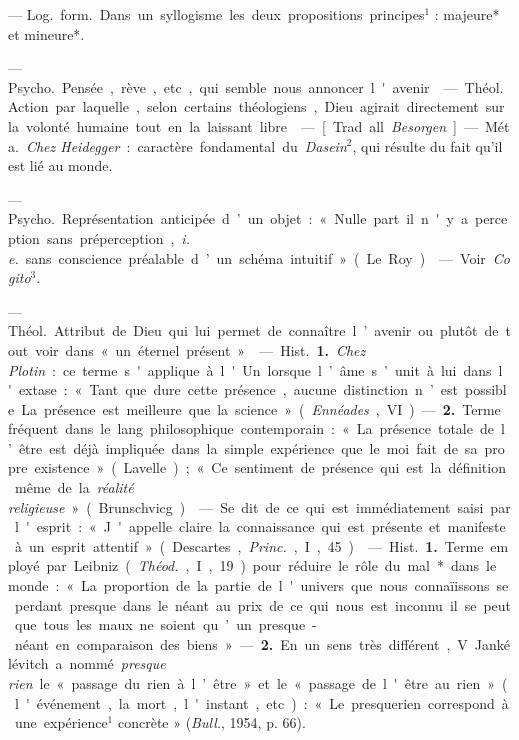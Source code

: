 \begin{itemize}[leftmargin=1cm, label=, itemsep=1pt]
 — \si{Log.} \si{form.} Dans un syllogisme les deux
propositions principes$^1$ : majeure* et mineure*.

 — \si{Psycho.} Pensée, rève, etc., qui semble nous annoncer
l'avenir.

 — \si{Théol.} Action par laquelle, selon certains
théologiens, Dieu agirait directement sur la volonté humaine tout en la
laissant libre.

 — [Trad. all. {\it Besorgen}] — \si{Méta.} {\it Chez
Heidegger} : caractère fondamental du {\it Dasein}$^2$, qui résulte du fait
qu'il est lié au monde.

 — \si{Psycho.} Représentation anticipée d’un objet : «
Nulle part il n'y a perception sans préperception, {\it i. e.} sans
conscience préalable d’un schéma intuitif. » (Le Roy).

 — Voir {\it Cogito}$^3$.

 — \si{Théol.} Attribut de Dieu qui lui permet de connaître
l’avenir ou plutôt de tout voir dans « un éternel présent ».

 — \si{Hist.} {\bf 1.} {\it Chez Plotin} : ce
terme s'applique à l'Un lorsque
l’âme s’unit à lui dans l'extase : « Tant que dure cette présence, aucune
distinction n’est possible... La présence est meilleure que la science »
({\it Ennéades}, VI). — {\bf 2.} Terme fréquent dans le lang. philosophique
contemporain : « La présence totale de l’être est déjà impliquée dans la
simple expérience que le moi fait de sa propre existence » (Lavelle) ; « Ce
sentiment de présence qui est la définition même de la {\it réalité
religieuse} » (Brunschvicg).

 — Se dit de ce qui est immédiatement saisi par l'esprit : «
J'appelle claire la connaissance qui est présente et manifeste à un esprit
attentif » (Descartes, {\it Princ.}, I, 45).

 — \si{Hist.} {\bf 1.} Terme employé par Leibniz
({\it Théod.}, I, 19) pour réduire le rôle du mal* dans le monde : « La
proportion de la partie de l'univers que nous connaïissons se perdant
presque dans le néant au prix de ce qui nous est inconnu... il se peut que
tous les maux ne soient qu’un presque-néant en comparaison des biens ». —
{\bf 2.} En un sens très différent, V. Jankélévitch a nommé {\it presque
rien} le « passage du rien à l’être » et le « passage de l'être au rien
» (l'événement, la mort, l'instant, etc.) : « Le presquerien correspond à
une expérience$^1$ concrète » ({\it Bull.}, 1954, p. 66).


\end{itemize}
